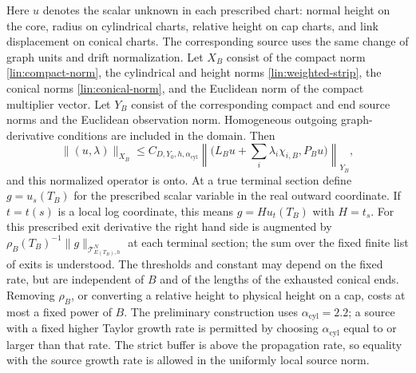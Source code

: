 \begin{proposition}
Here $u$ denotes the scalar unknown in each prescribed chart: normal
height on the core, radius on cylindrical charts, relative height on
cap charts, and link displacement on conical charts.  The corresponding
source uses the same change of graph units and drift normalization.
Let $X_B$ consist of the compact norm \eqref{lin:compact-norm}, the
cylindrical and height norms \eqref{lin:weighted-strip}, the conical
norms \eqref{lin:conical-norm}, and the Euclidean norm of the compact
multiplier vector.  Let $Y_B$ consist of the corresponding compact
and end source norms and the Euclidean observation norm.  Homogeneous
outgoing graph-derivative conditions are included in the domain.
Then
\begin{equation}\label{lin:global-estimate}
 \|(u,\lambda)\|_{X_B}
 \le C_{D,Y_0,h,\alpha_{\mathrm{cyl}}}
 \left\|\bigl(L_Bu+\sum_i\lambda_i\chi_{i,B},P_Bu\bigr)\right\|_{Y_B},
\end{equation}
and this normalized operator is onto.  At a true terminal section define
$g=u_s(T_B)$ for the prescribed scalar variable in the real outward
coordinate.  If $t=t(s)$ is a local log coordinate, this means
$g=H u_t(T_B)$ with $H=t_s$.  For this prescribed exit derivative
the right hand side is augmented by
$\rho_B(T_B)^{-1}\|g\|_{\mathcal T^N_{E(T_B),h}}$ at each terminal section;
the sum over the fixed finite list of exits is understood.
The thresholds and constant may depend on the fixed rate, but are independent
of $B$ and of the lengths of the exhausted
conical ends.  Removing $\rho_B$, or converting a relative height
to physical height on a cap, costs at most a fixed power of $B$.
The preliminary construction uses $\alpha_{\mathrm{cyl}}=2.2$; a source
with a fixed higher Taylor growth rate is permitted by choosing
$\alpha_{\mathrm{cyl}}$ equal to or larger than that rate.  The strict
buffer is above the propagation rate, so equality with the source growth
rate is allowed in the uniformly local source norm.
\end{proposition}

